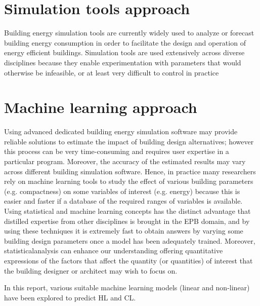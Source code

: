 \section {Simulation tools approach}
Building energy simulation tools are currently widely used to analyze or forecast building energy consumption in order to facilitate the design and operation of energy efficient buildings. Simulation tools are used extensively across diverse disciplines because they enable experimentation with parameters that would otherwise be infeasible, or at least very difficult to control in practice \cite{97d2aa88078644a3ab2ef0ca5fd99212}

\section{Machine learning approach}
Using advanced dedicated building energy simulation software may provide reliable solutions to estimate the impact of building design alternatives; however this process can be very time-consuming and requires user expertise in a particular program. Moreover, the accuracy of the estimated results may vary across different building simulation software. Hence, in practice many researchers rely on machine learning tools to study the effect of various building parameters (e.g. compactness) on some variables of interest (e.g. energy) because this is easier and faster if a database of the required ranges of variables is available. Using statistical and machine learning concepts has the distinct advantage that distilled expertise from other disciplines is brought in the EPB domain, and by using these techniques it is extremely fast to obtain answers by varying some building design parameters once a model has been adequately trained. Moreover, statisticalanalysis can enhance our understanding offering quantitative expressions of the factors that affect the quantity (or quantities) of interest that the building designer or architect may wish to focus on.

In this report, various suitable machine learning models (linear and non-linear) have been explored to predict HL and CL.

